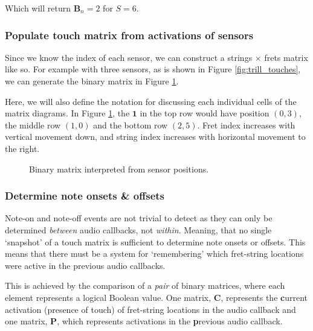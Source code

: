 Which will return $\mathbf{B}_n = 2$ for $S=6$. 

\subsubsection{Populate touch matrix from activations of sensors}
Since we know the index of each sensor, we can construct a strings $\times$ frets matrix like so. For example with three sensors, as is shown in Figure \ref{fig:trill_touches}, we can generate the binary matrix in Figure \ref{fig:binary_matrix}.

Here, we will also define the notation for discussing each individual cells of the matrix diagrams. In Figure \ref{fig:binary_matrix}, the $\mathbf{1}$ in the top row would have position $(0, 3)$, the middle row $(1, 0)$ and the bottom row $(2, 5)$. Fret index increases with vertical movement down, and string index increases with horizontal movement to the right. 



\begin{figure}[h]
    \centering
    \caption{Binary matrix interpreted from sensor positions.}
    \label{fig:binary_matrix}
\end{figure}

\subsubsection{Determine note onsets \& offsets}
Note-on and note-off events are not trivial to detect as they can only be determined \textit{between} audio callbacks, not \textit{within}. Meaning, that no single `snapshot' of a touch matrix is sufficient to determine note onsets or offsets. This means that there must be a system for `remembering' which fret-string locations were active in the previous audio callbacks. 

This is achieved by the comparison of a \textit{pair} of binary matrices,  where each element represents a logical Boolean value. One matrix, $\mathbf{C}$, represents the \textbf{c}urrent activation (presence of touch) of fret-string locations in the audio callback and one matrix, $\mathbf{P}$, which represents activations in the \textbf{p}revious audio callback.

